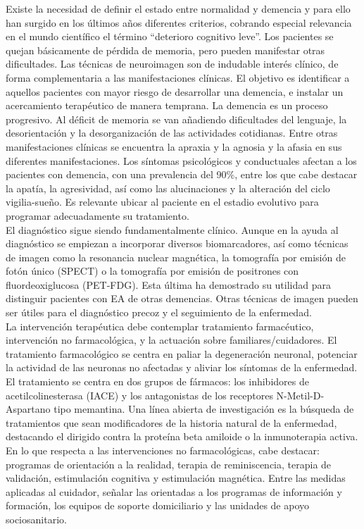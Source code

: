 Existe la necesidad de definir el estado entre normalidad y demencia y para ello han surgido en los últimos años diferentes criterios, cobrando especial relevancia en el mundo científico el término “deterioro cognitivo leve”. Los pacientes se quejan básicamente de pérdida de memoria, pero pueden manifestar otras dificultades. Las técnicas de neuroimagen son de indudable interés clínico, de forma complementaria a las manifestaciones clínicas. El objetivo es identificar a aquellos pacientes con mayor riesgo de desarrollar una demencia, e instalar un acercamiento terapéutico de manera temprana.
La demencia es un proceso progresivo. Al déficit de memoria se van añadiendo dificultades del lenguaje, la desorientación y la desorganización de las actividades cotidianas. Entre otras manifestaciones clínicas se encuentra la apraxia y la agnosia y la afasia en sus diferentes manifestaciones. Los síntomas psicológicos y conductuales afectan a los pacientes con demencia, con una prevalencia del 90\%, entre los que cabe destacar la apatía, la agresividad, así como las alucinaciones y la alteración del ciclo vigilia-sueño. Es relevante ubicar al paciente en el estadio evolutivo para programar adecuadamente su tratamiento.\\

El diagnóstico sigue siendo fundamentalmente clínico. Aunque en la ayuda al diagnóstico se empiezan a incorporar diversos biomarcadores, así como técnicas de imagen como la resonancia nuclear magnética, la tomografía por emisión de fotón único (SPECT) o la tomografía por emisión de positrones con fluordeoxiglucosa (PET-FDG). Esta última ha demostrado su utilidad para distinguir pacientes con EA de otras demencias. Otras técnicas de imagen pueden ser útiles para el diagnóstico precoz y el seguimiento de la enfermedad.\\

La intervención terapéutica debe contemplar tratamiento farmacéutico, intervención no farmacológica,  y la actuación sobre familiares/cuidadores. El tratamiento farmacológico se centra en paliar la degeneración neuronal, potenciar la actividad de las neuronas no afectadas y aliviar los síntomas de la enfermedad. El tratamiento se centra en dos grupos de fármacos: los inhibidores de acetilcolinesterasa (IACE) y los antagonistas de los receptores N-Metil-D-Aspartano tipo memantina. Una línea abierta de investigación es la búsqueda de tratamientos que sean modificadores de la historia natural de la enfermedad, destacando el dirigido contra la proteína beta amiloide o la inmunoterapia activa. En lo que respecta a las intervenciones no farmacológicas, cabe destacar: programas de orientación a la realidad, terapia de reminiscencia, terapia de validación, estimulación cognitiva y estimulación magnética. Entre las medidas aplicadas al cuidador, señalar las orientadas a los programas de información y formación, los equipos de soporte domiciliario y las unidades de apoyo sociosanitario.\\

